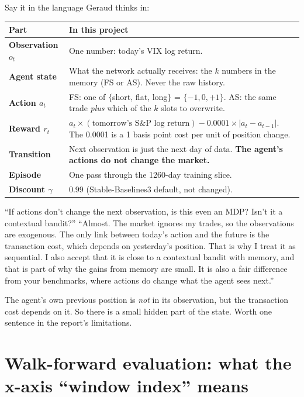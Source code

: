 \documentclass[11pt,a4paper]{article}
\begin{document}
Say it in the language Geraud thinks in:

\begin{longtable}{>{\bfseries}p{3cm} p{11.8cm}}
\toprule
Part & In this project \\
\midrule
Observation $o_t$ & One number: today's VIX log return. \\
Agent state & What the network actually receives: the $k$ numbers in the memory
  (FS or AS). Never the raw history. \\
Action $a_t$ & FS: one of $\{$short, flat, long$\}$ = $\{-1, 0, +1\}$. AS: the same trade
  \emph{plus} which of the $k$ slots to overwrite. \\
Reward $r_t$ & $a_t \times (\text{tomorrow's S\&P log return}) - 0.0001 \times
  |a_t - a_{t-1}|$. The 0.0001 is a 1 basis point cost per unit of position change. \\
Transition & Next observation is just the next day of data. \textbf{The agent's actions do
  not change the market.} \\
Episode & One pass through the 1260-day training slice. \\
Discount $\gamma$ & 0.99 (Stable-Baselines3 default, not changed). \\
\bottomrule
\end{longtable}

\begin{qa}{``If actions don't change the next observation, is this even an MDP? Isn't it a
contextual bandit?''}
``Almost. The market ignores my trades, so the observations are exogenous. The only link
between today's action and the future is the transaction cost, which depends on yesterday's
position. That is why I treat it as sequential. I also accept that it is close to a
contextual bandit with memory, and that is part of why the gains from memory are small.
It is also a fair difference from your benchmarks, where actions do change what the agent
sees next.''
\end{qa}

\begin{honest}
The agent's own previous position is \emph{not} in its observation, but the transaction cost
depends on it. So there is a small hidden part of the state. Worth one sentence in the
report's limitations.
\end{honest}

\section{Walk-forward evaluation: what the x-axis ``window index'' means}
\end{document}
